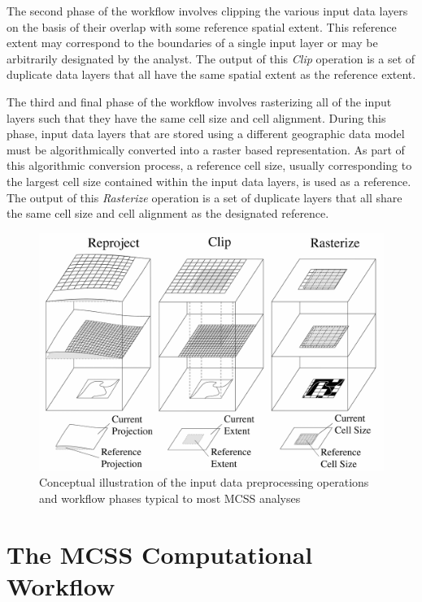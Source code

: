 The second phase of the workflow involves clipping the various input data layers on the basis of their overlap with some reference spatial extent. This reference extent may correspond to the boundaries of a single input layer or may be arbitrarily designated by the analyst. The output of this \textit{Clip} operation is a set of duplicate data layers that all have the same spatial extent as the reference extent. 

The third and final phase of the workflow involves rasterizing all of the input layers such that they have the same cell size and cell alignment. During this phase, input data layers that are stored using a different geographic data model must be algorithmically converted into a raster based representation. As part of this algorithmic conversion process, a reference cell size, usually corresponding to the largest cell size contained within the input data layers, is used as a reference. The output of this \textit{Rasterize} operation is a set of duplicate layers that all share the same cell size and cell alignment as the designated reference.
    
        \begin{figure}[!h]
            \includegraphics[width=5.5in]{figures/data_processing_workflow.png}
             \caption{Conceptual illustration of the input data preprocessing operations and workflow phases typical to most MCSS analyses}
              \label{fig:Preprocessing}
        \end{figure} 
        
\section{The MCSS Computational Workflow}
    
